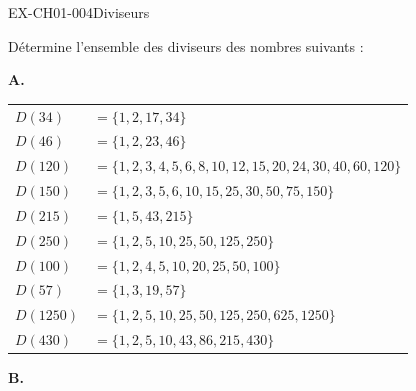\documentclass[12pt, a4paper]{article}
\begin{document}
\begin{exercice}{EX-CH01-004}{Diviseurs}

Détermine l'ensemble des diviseurs des nombres suivants :
\bigskip

\textbf{A.}

\medskip
{}%
{\def\arraystretch{1.2}
\begin{tabularx}{\linewidth}{lX}
$D(34)$   & $= \{1, 2, 17, 34\}$ \\
$D(46)$   & $= \{1, 2, 23, 46\}$ \\
$D(120)$  & $= \{1, 2, 3, 4, 5, 6, 8, 10, 12, 15, 20, 24, 30, 40, 60, 120\}$ \\
$D(150)$  & $= \{1, 2, 3, 5, 6, 10, 15, 25, 30, 50, 75, 150\}$ \\
$D(215)$  & $= \{1, 5, 43, 215\}$ \\
$D(250)$  & $= \{1, 2, 5, 10, 25, 50, 125, 250\}$ \\
$D(100)$  & $= \{1, 2, 4, 5, 10, 20, 25, 50, 100\}$ \\
$D(57)$   & $= \{1, 3, 19, 57\}$ \\
$D(1250)$ & $= \{1, 2, 5, 10, 25, 50, 125, 250, 625, 1250\}$ \\
$D(430)$  & $= \{1, 2, 5, 10, 43, 86, 215, 430\}$ \\
\end{tabularx}
\def\arraystretch{1}}

\vspace{20pt}

\textbf{B.}


\end{exercice}
\end{document}
